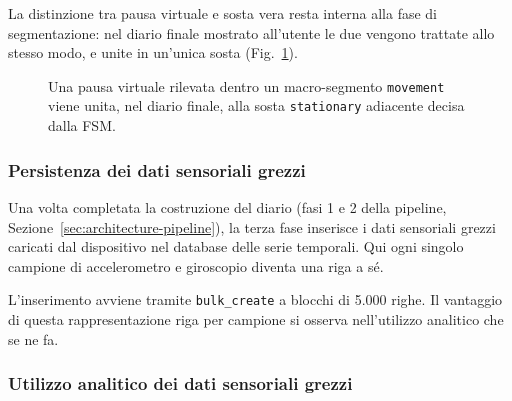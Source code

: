 \documentclass[conference]{IEEEtran}
\begin{document}
La distinzione tra pausa virtuale e sosta vera resta interna alla
fase di segmentazione: nel diario finale mostrato all'utente le due
vengono trattate allo stesso modo, e unite in un'unica sosta
(Fig.~\ref{fig:virtual-stop-merge}).

\begin{figure}[htbp]
\centering
{}
\caption{Una pausa virtuale rilevata dentro un macro-segmento
\texttt{movement} viene unita, nel diario finale, alla sosta
\texttt{stationary} adiacente decisa dalla FSM.}
\label{fig:virtual-stop-merge}
\end{figure}

\subsubsection{Persistenza dei dati sensoriali grezzi}

Una volta completata la costruzione del diario (fasi 1 e 2 della
pipeline, Sezione~\ref{sec:architecture-pipeline}), la terza fase
inserisce i dati sensoriali grezzi caricati dal dispositivo nel
database delle serie temporali. Qui ogni singolo campione di accelerometro e giroscopio diventa una riga a sé.

L'inserimento avviene tramite \texttt{bulk\_create} a blocchi di 5.000
righe. 
Il vantaggio di questa rappresentazione riga per campione si osserva nell'utilizzo
analitico che se ne fa.

\subsubsection{Utilizzo analitico dei dati sensoriali grezzi}
\end{document}
